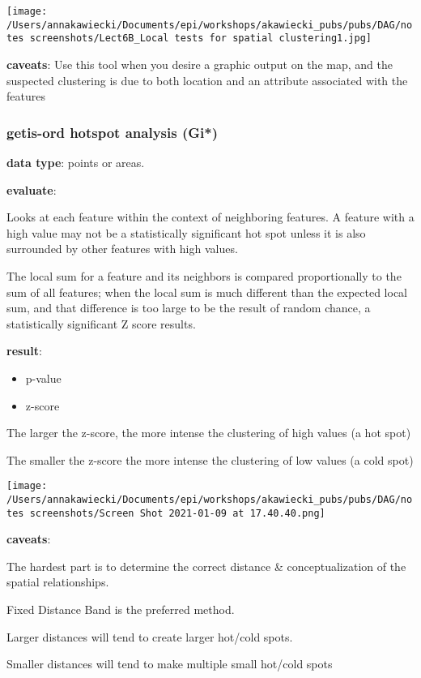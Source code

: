 \documentclass[
]{article}
\begin{document}
\texttt{[image: /Users/annakawiecki/Documents/epi/workshops/akawiecki\_pubs/pubs/DAG/notes screenshots/Lect6B\_Local tests for spatial clustering1.jpg]}

\textbf{caveats}: Use this tool when you desire a graphic output on the
map, and the suspected clustering is due to both location and an
attribute associated with the features

\hypertarget{getis-ord-hotspot-analysis-gi}{%
\subsubsection{getis-ord hotspot analysis
(Gi*)}\label{getis-ord-hotspot-analysis-gi}}

\textbf{data type}: points or areas.

\textbf{evaluate}:

Looks at each feature within the context of neighboring features. A
feature with a high value may not be a statistically significant hot
spot unless it is also surrounded by other features with high values.

The local sum for a feature and its neighbors is compared proportionally
to the sum of all features; when the local sum is much different than
the expected local sum, and that difference is too large to be the
result of random chance, a statistically significant Z score results.

\textbf{result}:

\begin{itemize}
\item
  p-value
\item
  z-score
\end{itemize}

The larger the z-score, the more intense the clustering of high values
(a hot spot)

The smaller the z-score the more intense the clustering of low values (a
cold spot)

\texttt{[image: /Users/annakawiecki/Documents/epi/workshops/akawiecki\_pubs/pubs/DAG/notes screenshots/Screen Shot 2021-01-09 at 17.40.40.png]}

\textbf{caveats}:

The hardest part is to determine the correct distance \&
conceptualization of the spatial relationships.

Fixed Distance Band is the preferred method.

Larger distances will tend to create larger hot/cold spots.

Smaller distances will tend to make multiple small hot/cold spots
\end{document}
